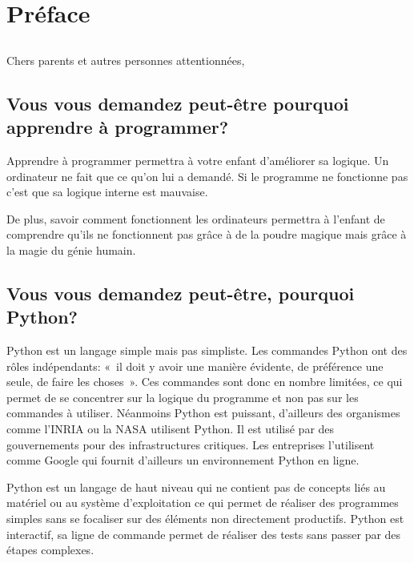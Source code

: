 



\markboth{}{}

\chapter{Préface}
\section*{}

Chers parents et autres personnes attentionnées,\\

\section*{Vous vous demandez peut-être pourquoi apprendre à programmer?}
Apprendre à programmer permettra à votre enfant d'améliorer sa logique. Un ordinateur ne fait que ce qu'on lui a demandé. Si le programme ne fonctionne pas c'est que sa logique interne est mauvaise. 

De plus, savoir comment fonctionnent les ordinateurs permettra à l'enfant de compren\-dre qu'ils ne fonctionnent pas grâce à de la poudre magique mais grâce à la magie du génie humain.


\section*{Vous vous demandez peut-être, pourquoi Python?}
Python est un langage simple mais pas simpliste. Les commandes Python ont des rôles indépendants: «~il doit y avoir une manière évidente, de préférence une seule, de faire les choses~». Ces commandes sont donc en nombre limitées, ce qui permet de se concentrer sur la logique du programme et non pas sur les commandes à utiliser. 
Néanmoins Python est puissant, d'ailleurs des organismes comme l'INRIA ou la NASA utilisent Python. Il est utilisé par des gouvernements pour des infrastructures critiques. Les entreprises l'utilisent comme Google qui fournit d'ailleurs un environnement Python en ligne.

Python est un langage de haut niveau qui ne contient pas de concepts liés au matériel ou au système d'exploitation ce qui permet de réaliser des programmes simples sans se focaliser sur des éléments non directement productifs. Python est interactif, sa ligne de commande permet de réaliser des tests sans passer par des étapes complexes.

